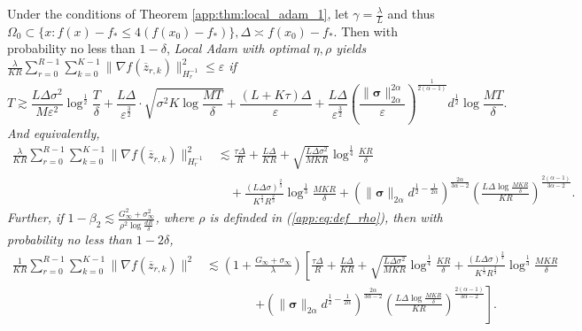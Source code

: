 \documentclass{article} %
\numberwithin{equation}{section}
\renewcommand{\eqref}[1]{(\ref{#1})}
\begin{document}
\begin{thm}\label{app:thm:local_adam_2}
    Under the conditions of Theorem \ref{app:thm:local_adam_1}, let $\gamma=\frac{\lambda}{L}$ and thus $\Omega_0\subset \{x: f(x)-f_*\leq 4(f(x_0)-f_*)\}, \Delta\asymp f(x_0)-f_*$. 
    Then with probability no less than $1-\delta$, \em Local \em Adam with optimal $\eta,\rho$ yields $\frac{\lambda}{KR}\sum_{r=0}^{R-1}\sum_{k=0}^{K-1}\|\nabla f(\overline{z}_{r,k}) \|_{H_r^{-1}}^2 \leq \varepsilon$ if
    \begin{equation}\label{app:eq:coro_T_bound_local_adam}
        T\gtrsim \frac{L\Delta\sigma^2}{M\varepsilon^2}\log^{\frac{1}{2}}\frac{T}{\delta} + \frac{L\Delta}{\varepsilon^{\frac{3}{2}}}\cdot \sqrt{\sigma^2K\log\frac{MT}{\delta}} + \frac{(L+K\tau)\Delta}{\varepsilon} + \frac{L\Delta}{\varepsilon^{\frac{3}{2}}}\left(\frac{\|\boldsymbol{\sigma}\|_{2\alpha}^{2\alpha}}{\varepsilon}\right)^{\frac{1}{2(\alpha-1)}}d^{\frac{1}{2}}\log\frac{MT}{\delta}.
    \end{equation}
    And equivalently,
    \begin{equation}
        \begin{aligned}
            \frac{\lambda}{KR}\sum_{r=0}^{R-1}\sum_{k=0}^{K-1}\|\nabla f(\overline{z}_{r,k}) \|_{H_r^{-1}}^2 
            &\lesssim \frac{\tau\Delta}{R} + \frac{L\Delta}{KR} + \sqrt{\frac{L\Delta\sigma^2}{MKR}}\log^{\frac{1}{4}}\frac{KR}{\delta} \\
            &\quad + \frac{(L\Delta\sigma)^{\frac{2}{3}}}{K^{\frac{1}{3}}R^{\frac{2}{3}}}\log^{\frac{1}{3}}\frac{MKR}{\delta} + \left(\|\boldsymbol{\sigma}\|_{2\alpha}d^{\frac{1}{2}-\frac{1}{2\alpha}}\right)^{\frac{2\alpha}{3\alpha-2}}\left(\frac{L\Delta\log\frac{MKR}{\delta}}{KR}\right)^{\frac{2(\alpha-1)}{3\alpha-2}}.
        \end{aligned}
    \end{equation}
    Further, if $1-\beta_2\lesssim \frac{G_\infty^2+\sigma_\infty^2}{\rho^2\log\frac{dR}{\delta}}$, where $\rho$ is definded in \eqref{app:eq:def_rho}, then with probability no less than $1-2\delta$,
    \begin{equation}
        \begin{aligned}
            \frac{1}{KR}\sum_{r=0}^{R-1}\sum_{k=0}^{K-1}\|\nabla f(\overline{z}_{r,k}) \|^2 
            &\lesssim \left(1+\frac{G_\infty+\sigma_\infty}{\lambda}\right)\left[\frac{\tau\Delta}{R} + \frac{L\Delta}{KR} + \sqrt{\frac{L\Delta\sigma^2}{MKR}}\log^{\frac{1}{4}}\frac{KR}{\delta} + \frac{(L\Delta\sigma)^{\frac{2}{3}}}{K^{\frac{1}{3}}R^{\frac{2}{3}}}\log^{\frac{1}{3}}\frac{MKR}{\delta} \right. \\
            &\qquad\qquad \left.+ \left(\|\boldsymbol{\sigma}\|_{2\alpha}d^{\frac{1}{2}-\frac{1}{2\alpha}}\right)^{\frac{2\alpha}{3\alpha-2}}\left(\frac{L\Delta\log\frac{MKR}{\delta}}{KR}\right)^{\frac{2(\alpha-1)}{3\alpha-2}}\right].
        \end{aligned}
    \end{equation}
\end{thm}
\end{document}
